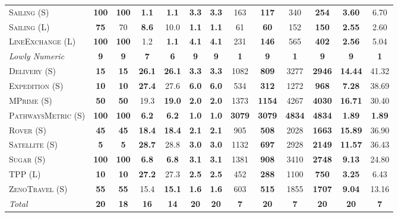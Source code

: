 \documentclass[11pt]{article}
\begin{document}
\begin{table}[tb]
{\begin{tabular}{|l||cc||cc||cc||cc||cc||cc||}
\textsc{Sailing} (S)&\textbf{100}&\textbf{100}&\textbf{1.1}&\textbf{1.1}&\textbf{3.3}&\textbf{3.3}&163&\textbf{117}&340&\textbf{254}&\textbf{3.60}&6.70\\
\textsc{Sailing} (L)&\textbf{75}&70&\textbf{8.6}&10.0&\textbf{1.1}&\textbf{1.1}&61&\textbf{60}&152&\textbf{150}&\textbf{2.55}&2.60\\
\textsc{LineExchange} (L)&\textbf{100}&\textbf{100}&1.2&\textbf{1.1}&\textbf{4.1}&\textbf{4.1}&231&\textbf{146}&565&\textbf{402}&\textbf{2.56}&5.04
\\\hline
\textit{Lowly Numeric}&\textbf{9}&\textbf{9}&\textbf{7}&\textbf{6}&\textbf{9}&\textbf{9}&\textbf{1}&\textbf{9}&\textbf{1}&\textbf{9}&\textbf{9}&\textbf{1}\\\hline
\textsc{Delivery} (S)&\textbf{15}&\textbf{15}&\textbf{26.1}&\textbf{26.1}&\textbf{3.3}&\textbf{3.3}&1082&\textbf{809}&3277&\textbf{2946}&\textbf{14.44}&41.32\\
\textsc{Expedition} (S)&\textbf{10}&\textbf{10}&\textbf{27.4}&27.6&\textbf{6.0}&\textbf{6.0}&534&\textbf{312}&1272&\textbf{968}&\textbf{7.28}&38.69\\
\textsc{MPrime} (S)&\textbf{50}&\textbf{50}&19.3&\textbf{19.0}&\textbf{2.0}&\textbf{2.0}&1373&\textbf{1154}&4267&\textbf{4030}&\textbf{16.71}&30.40\\
\textsc{PathwaysMetric} (S)&\textbf{100}&\textbf{100}&\textbf{6.2}&\textbf{6.2}&\textbf{1.0}&\textbf{1.0}&\textbf{3079}&\textbf{3079}&\textbf{4834}&\textbf{4834}&\textbf{1.89}&\textbf{1.89}\\
\textsc{Rover} (S)&\textbf{45}&\textbf{45}&\textbf{18.4}&\textbf{18.4}&\textbf{2.1}&\textbf{2.1}&905&\textbf{508}&2028&\textbf{1663}&\textbf{15.89}&36.90\\
\textsc{Satellite} (S)&\textbf{5}&\textbf{5}&\textbf{28.7}&28.8&\textbf{3.0}&\textbf{3.0}&1132&\textbf{697}&2928&\textbf{2149}&\textbf{11.57}&36.43\\
\textsc{Sugar} (S)&\textbf{100}&\textbf{100}&\textbf{6.8}&\textbf{6.8}&\textbf{3.1}&\textbf{3.1}&1381&\textbf{908}&3410&\textbf{2748}&\textbf{9.13}&24.80\\
\textsc{TPP} (L)&\textbf{10}&\textbf{10}&\textbf{27.2}&27.3&\textbf{2.5}&\textbf{2.5}&452&\textbf{288}&1100&\textbf{750}&\textbf{3.25}&6.43\\
\textsc{ZenoTravel} (S)&\textbf{55}&\textbf{55}&15.4&\textbf{15.1}&\textbf{1.6}&\textbf{1.6}&603&\textbf{515}&1855&\textbf{1707}&\textbf{9.04}&13.16
\\\hline
\textit{Total}&\textbf{20}&\textbf{18}&\textbf{16}&\textbf{14}&\textbf{20}&\textbf{20}&\textbf{7}&\textbf{20}&\textbf{7}&\textbf{20}&\textbf{20}&\textbf{7}\\\hline


\end{tabular}}
\end{table}
\end{document}
